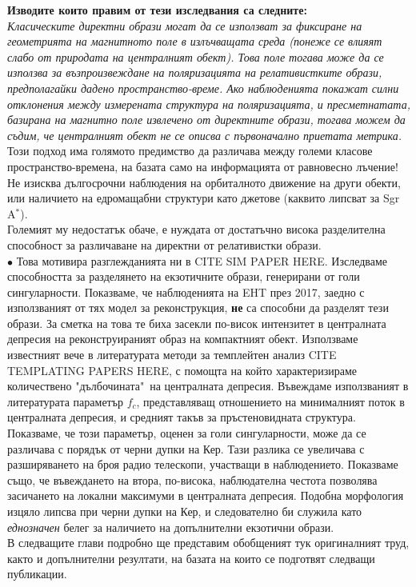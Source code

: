 \textbf{Изводите които правим от тези изследвания са следните:}\\
\emph{Класическите директни образи могат да се използват за фиксиране на геометрията на магнитното поле в излъчващата среда (понеже се влияят слабо от природата на централният обект). Това поле тогава може да се използва за възпроизвеждане на поляризацията на релативистките образи, предполагайки дадено пространство-време. Ако наблюденията покажат силни отклонения между измерената структура на поляризацията, и пресметнатата, базирана на магнитно поле извлечено от директните образи, тогава можем да съдим, че централният обект не се описва с първоначално приетата метрика.}\\\newline
Този подход има голямото предимство да различава между големи класове пространство-времена, на базата само на информацията от равновесно лъчение! Не изисква дългосрочни наблюдения на орбиталното движение на други обекти, или наличието на едромащабни структури като джетове (каквито липсват за Sgr A$^*$).\\

\noindent Големият му недостатък обаче, е нуждата от достатъчно висока разделителна способност за различаване на директни от релативистки образи. \\\newline
$\bullet$ Това мотивира разглежданията ни в CITE SIM PAPER HERE. Изследваме способността за разделянето на екзотичните образи, генерирани от голи сингуларности. Показваме, че наблюденията на EHT през 2017, заедно с използваният от тях модел за реконструкция, \textbf{не} са способни да разделят тези образи. За сметка на това те биха засекли по-висок интензитет в централната депресия на реконструираният образ на компактният обект. Използваме известният вече в литературата методи за темплейтен анализ CITE TEMPLATING PAPERS HERE, с помощта на който характеризираме количествено "дълбочината"$\,$ на централната депресия. Въвеждаме използваният в литературата параметър $f_c$, представляващ отношението на минималният поток в централната депресия, и средният такъв за пръстеновидната структура. Показваме, че този параметър, оценен за голи сингуларности, може да се различава с порядък от черни дупки на Кер. Тази разлика се увеличава с разширяването на броя радио телескопи, участващи в наблюдението. Показваме също, че въвеждането на втора, по-висока, наблюдателна честота позволява засичането на локални максимуми в централната депресия. Подобна морфология изцяло липсва при черни дупки на Кер, и следователно би служила като \emph{еднозначен} белег за наличието на допълнителни екзотични образи.\\\newline
В следващите глави подробно ще представим обобщеният тук оригиналният труд, както и допълнителни резултати, на базата на които се подготвят следващи публикации. 
\lfoot{}